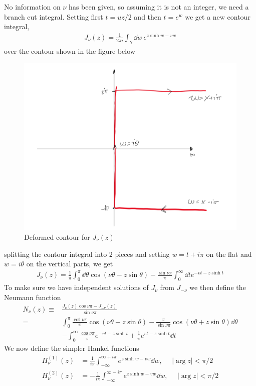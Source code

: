 \documentclass[a4paper,12pt]{article}
\begin{document}
No information on $\nu$ has been given, so assuming it is not an integer, we need a branch cut integral. Setting first $t=uz/2$ and then $t=e^w$ we get a new contour integral,
\begin{equation}
	\begin{aligned}
		J_\nu(z)=\frac{1}{2\pi i} \int_\gamma \dd w\, e^{z\sinh{w} -vw}
	\end{aligned}
\end{equation}
over the contour shown in the figure below
\begin{figure}[H]
	\centering
	\includegraphics[width=0.5\linewidth]{26}
	\caption{Deformed contour for $J_\nu(z)$}
	\label{fig:rectangle}
\end{figure}
splitting the contour integral into 2 pieces and setting $w=t+i\pi$ on the flat and $w=i\theta$ on the vertical parts, we get
\begin{equation}
	\begin{aligned}
	J_\nu(z)=\frac{1}{\pi} \int_0^\pi \dd \theta\cos(\nu\theta -z\sin\theta)
	-\frac{\sin\nu\pi}{\pi} \int_0^\infty\dd t e^{-vt-z\sinh t}
	\end{aligned}
\end{equation}
To make sure we have independent solutions of $J_{\nu}$ from $J_{-\nu}$ we then define the Neumann function
\begin{equation}
	\begin{aligned}
		N_\nu(z)\equiv& \frac{J_\nu(z)\cos{\nu\pi-J_{-\nu}(z)}}{\sin{\nu\pi}}\\
		=&
		\int_0^\pi \frac{\cot{\nu\pi}}{\pi}\cos(\nu\theta -z\sin\theta)-\frac{\pi}{\sin{\nu\pi}}\cos(\nu\theta +z\sin\theta)\dd \theta\\
		&- \int_0^\infty \frac{\cos\nu\pi}{\pi} e^{-vt-z\sinh t}+\frac{1}{\pi} e^{vt-z\sinh t}\dd t
	\end{aligned}
\end{equation}
We now define the simpler Hankel functions 
\begin{equation}
	\begin{aligned}
		H_\nu^{(1)}(z)&=\frac{1}{i\pi }\int_{-\infty}^{\infty+i\pi}e^{z\sinh w-vw}\dd w,~~~~~~|\arg z|<\pi/2\\
	H_\nu^{(2)}(z)&=-\frac{1}{i\pi }\int_{-\infty}^{\infty-i\pi}e^{z\sinh w-vw}\dd w,~~~~~~|\arg z|<\pi/2\\
	\end{aligned}
\end{equation}
\end{document}
